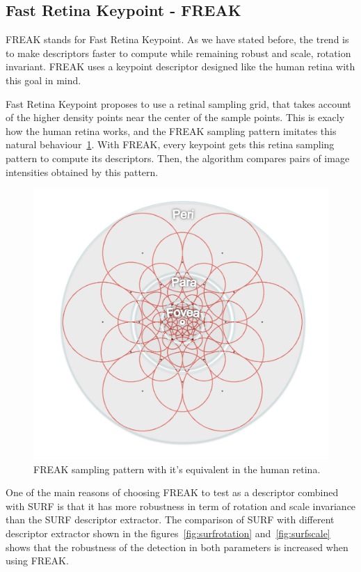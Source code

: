 \subsection{Fast Retina Keypoint - FREAK}
FREAK stands for Fast Retina Keypoint\cite{Ortiz:2012:FFR:2354409.2354903}. As we
have stated before, the trend is to make descriptors faster to compute while
remaining robust and scale, rotation invariant. FREAK uses a keypoint descriptor
designed like the human retina with this goal in mind.

Fast Retina Keypoint proposes to use a retinal sampling grid, that takes account of
the higher density points near the center of the sample points. This is exacly how
the human retina works, and the FREAK sampling pattern imitates this natural
behaviour~\ref{fig:freak}. With FREAK, every keypoint gets this retina sampling
pattern to compute its descriptors. Then, the algorithm compares pairs of image
intensities obtained by this pattern.

\begin{figure}
\centering
\includegraphics[scale=0.55]{img/freak.png}
\caption{\label{fig:freak}FREAK sampling pattern with it's equivalent in the human
  retina.} 
\end{figure} 

One of the main reasons of choosing FREAK to test as a descriptor combined with
SURF is that it has more robustness in term of rotation and scale
invariance than the SURF descriptor extractor. The
comparison of SURF with different descriptor 
extractor\cite{rotationscaleinv} shown in the figures~\ref{fig:surfrotation}
and~\ref{fig:surfscale}
shows that the robustness of the detection in both parameters is increased when
using FREAK. 

